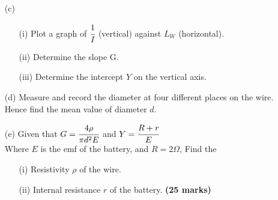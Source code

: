 \begin{enumerate}
\begin{enumerate}
\item[(c)]
\begin{enumerate}
\item[(i)] Plot a graph of $\cfrac{1}{I}$ (vertical) against $L_W$ (horizontal).
\item[(ii)] Determine the slope G.
\item[(iii)] Determine the intercept $Y$ on the vertical axis.
\end{enumerate}
\item[(d)] Measure and record the diameter at four different places on the wire. Hence find the mean value of diameter $d$.
\item[(e)] Given that $G = \cfrac{4\rho}{\pi d^2E}$ and $Y = \cfrac{R + r}{E}$\\[10pt]
Where $E$ is the emf of the battery, and $R = 2 \Omega$, Find the
\begin{enumerate}
\item[(i)] Resistivity $\rho$ of the wire.
\item[(ii)]	Internal resistance $r$ of the battery. \hfill \textbf{(25 marks)}
\end{enumerate}
\end{enumerate}

\end{enumerate}